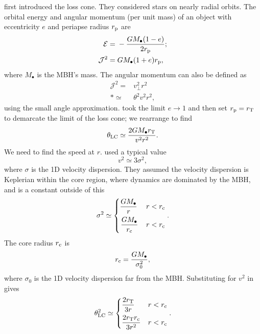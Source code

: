\citet{Frank1976} first introduced the loss cone. They considered stars on nearly radial orbits. The orbital energy and angular momentum (per unit mass) of an object with eccentricity $e$ and periapse radius $r_\mathrm{p}$ are
\begin{align}
\mathcal{E} = {} & -\frac{GM_\bullet(1 - e)}{2r_\mathrm{p}}; \\
\mathcal{J}^2 = {} & GM_\bullet(1 + e)r_\mathrm{p},
\end{align}
where $M_\bullet$ is the MBH's mass. The angular momentum can also be defined as
\begin{align}
\mathcal{J}^2 = {} & v_\perp^2r^2 \nonumber \\*
 \simeq {} & \theta^2v^2r^2,
\end{align}
using the small angle approximation. \citet{Frank1976} took the limit $e \rightarrow 1$ and then set $r_\mathrm{p} = r_\mathrm{T}$ to demarcate the limit of the loss cone; we rearrange to find
\begin{equation}
\theta_\mathrm{LC} \simeq \frac{2GM_\bullet r_\mathrm{T}}{v^2r^2}.
\label{eq:LC-FR}
\end{equation}
We need to find the speed at $r$. \citet{Frank1976} used a typical value
\begin{equation}
v^2 \simeq 3\sigma^2,
\end{equation}
where $\sigma$ is the 1D velocity dispersion. They assumed the velocity dispersion is Keplerian within the core region, where dynamics are dominated by the MBH, and is a constant outside of this
\begin{equation}
\sigma^2 \simeq \begin{cases}
\displaystyle \frac{GM_\bullet}{r} & r < r\sub{c} \vspace{0.4\normalbaselineskip} \\
\displaystyle \left. \frac{GM_\bullet}{r\sub{c}} \right. & r < r\sub{c}
\end{cases}.
\end{equation}
The core radius $r_\mathrm{c}$ is
\begin{equation}
r_\mathrm{c} = \frac{GM_\bullet}{\sigma_0^2},
\end{equation}
where $\sigma_0$ is the 1D velocity dispersion far from the MBH. Substituting for $v^2$ in  gives
\begin{align}
\theta\sub{LC}^2 \simeq \begin{cases}
\displaystyle \frac{2r\sub{T}}{3r} & r < r\sub{c} \vspace{0.4\normalbaselineskip} \\
\displaystyle \frac{2r\sub{T}r\sub{c}}{3r^2} & r < r\sub{c}
\end{cases}.
\label{eq:FR-LC}
\end{align}
